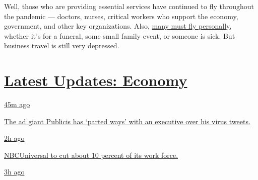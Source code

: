 Well, those who are providing essential services have continued to fly
throughout the pandemic --- doctors, nurses, critical workers who
support the economy, government, and other key organizations. Also,
\href{https://www.nytimes.com/2020/06/09/business/flying-coronovirus.html}{many
must fly personally}, whether it's for a funeral, some small family
event, or someone is sick. But business travel is still very depressed.

\hypertarget{latest-updates-economy}{%
\section{\texorpdfstring{\href{https://www.nytimes.com/live/2020/08/04/business/stock-market-today-coronavirus?action=click\&pgtype=Article\&state=default\&region=MAIN_CONTENT_1\&context=storylines_live_updates}{Latest
Updates:
Economy}}{Latest Updates: Economy}}\label{latest-updates-economy}}

\href{https://www.nytimes.com/live/2020/08/04/business/stock-market-today-coronavirus?action=click\&pgtype=Article\&state=default\&region=MAIN_CONTENT_1\&context=storylines_live_updates\#the-ad-giant-publicis-has-parted-ways-with-an-executive-over-his-virus-tweets}{45m
ago}

\href{https://www.nytimes.com/live/2020/08/04/business/stock-market-today-coronavirus?action=click\&pgtype=Article\&state=default\&region=MAIN_CONTENT_1\&context=storylines_live_updates\#the-ad-giant-publicis-has-parted-ways-with-an-executive-over-his-virus-tweets}{The
ad giant Publicis has `parted ways' with an executive over his virus
tweets.}

\href{https://www.nytimes.com/live/2020/08/04/business/stock-market-today-coronavirus?action=click\&pgtype=Article\&state=default\&region=MAIN_CONTENT_1\&context=storylines_live_updates\#nbcuniversal-to-cut-about-10-percent-of-its-work-force}{2h
ago}

\href{https://www.nytimes.com/live/2020/08/04/business/stock-market-today-coronavirus?action=click\&pgtype=Article\&state=default\&region=MAIN_CONTENT_1\&context=storylines_live_updates\#nbcuniversal-to-cut-about-10-percent-of-its-work-force}{NBCUniversal
to cut about 10 percent of its work force.}

\href{https://www.nytimes.com/live/2020/08/04/business/stock-market-today-coronavirus?action=click\&pgtype=Article\&state=default\&region=MAIN_CONTENT_1\&context=storylines_live_updates\#loans-are-harder-to-get-even-as-interest-rates-are-low}{3h
ago}

